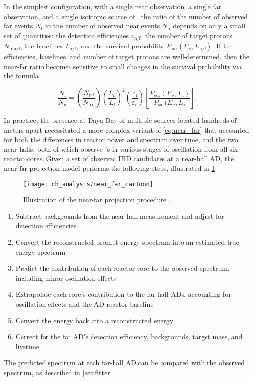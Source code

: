 In the simplest configuration, with a single near observation,
a single far observation, and a single isotropic source of \nuebar,
the ratio of the number of observed far events $N_\text{f}$
to the number of observed near events $N_\text{n}$
depends on only a small set of quantities:
the detection efficiencies $\varepsilon_\text{n/f}$,
the number of target protons $N_\text{p,n/f}$,
the baselines $L_\text{n/f}$,
and the survival probability $P_\text{sur}(E_\nu, L_\text{n/f})$.
If the efficiencies, baselines, and number of target protons are well-determined,
then the near-far ratio becomes sensitive
to small changes in the survival probability via the formula \cite{ngd2016}

\begin{equation}\label{eq:near_far}
    \frac{N_\text{f}}{N_\text{n}} = \left(\frac{N_\text{p,f}}{N_\text{p,n}}\right)
    \left(\frac{L_\text{n}}{L_\text{f}}\right)^2
    \left(\frac{\varepsilon_\text{f}}{\varepsilon_\text{n}}\right)
    \left[\frac{P_\text{sur}(E_\nu, L_\text{f})}{P_\text{sur}(E_\nu, L_\text{n}}\right].
\end{equation}

In practice, the presence at Daya Bay of multiple \nuebar{} sources
located hundreds of meters apart
necessitated a more complex variant of \cref{eq:near_far}
that accounted for both the differences in reactor power and \nuebar{} spectrum over time,
and the two near halls, both of which observe \nuebar{}'s
in various stages of oscillation from all six reactor cores.
Given a set of observed IBD candidates at a near-hall AD,
the near-far projection model performs the following steps,
illustrated in \cref{fig:near_far_cartoon}:

\begin{figure}
    \centering
    \texttt{[image: ch\_analysis/near\_far\_cartoon]}
    \caption[Diagram of near-to-far projection]{Illustration of the near-far projection procedure \cite{p12e_fitter}.}
    \label{fig:near_far_cartoon}
\end{figure}

\begin{enumerate}
    \item Subtract backgrounds from the near hall measurement
        and adjust for detection efficiencies
    \item Convert the reconstructed prompt energy spectrum
        into an estimated true \nuebar{} energy spectrum
    \item Predict the contribution of each reactor core
        to the observed \nuebar{} spectrum,
        including minor oscillation effects
    \item Extrapolate each core's contribution to the far hall ADs,
        accounting for oscillation effects and the AD-reactor baseline
    \item Convert the \nuebar{} energy back into a reconstructed energy
    \item Correct for the far AD's detection efficiency, backgrounds,
        target mass, and livetime
\end{enumerate}
The predicted spectrum at each far-hall AD can be compared
with the observed spectrum, as described in \cref{sec:fitter}.

